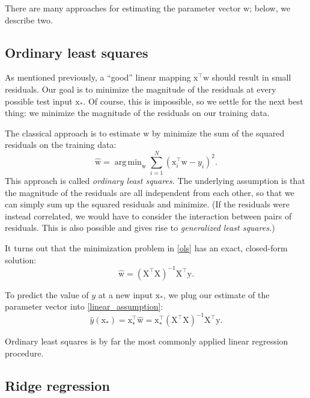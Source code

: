 \documentclass{article}
\newcommand{\inv}{^{-1}}
\newcommand{\trans}{^\top}
\newcommand{\mat}[1]{\bm{\mathrm{#1}}}
\renewcommand{\vec}[1]{\bm{\mathrm{#1}}}
\DeclareMathOperator*{\argmin}{arg\,min}
\begin{document}
There are many approaches for estimating the parameter vector
$\vec{w}$; below, we describe two.

\subsection*{Ordinary least squares}

As mentioned previously, a ``good'' linear mapping $\vec{x}\trans
\vec{w}$ should result in small residuals.  Our goal is to minimize
the magnitude of the residuals at every possible test input
$\vec{x}_\ast$.  Of course, this is impossible, so we settle for the
next best thing: we minimize the magnitude of the residuals on our
training data.

The classical approach is to estimate $\vec{w}$ by minimize the sum of
the squared residuals on the training data:
\begin{equation}
  \label{ols}
  \hat{\vec{w}}
  =
  \argmin_{\vec{w}}
  \sum_{i = 1}^N
  (\vec{x}_i\trans \vec{w} - y_i)^2.
\end{equation}
This approach is called \emph{ordinary least squares.}  The underlying
assumption is that the magnitude of the residuals are all independent
from each other, so that we can simply sum up the squared residuals
and minimize.  (If the residuals were instead correlated, we would
have to consider the interaction between pairs of residuals.  This is
also possible and gives rise to \emph{generalized least squares.})

It turns out that the minimization problem in \eqref{ols} has an
exact, closed-form solution:
\begin{equation*}
  \hat{\vec{w}} = (\mat{X}\trans\mat{X})\inv \mat{X}\trans \vec{y}.
\end{equation*}

To predict the value of $y$ at a new input $\vec{x}_\ast$, we plug our
estimate of the parameter vector into \eqref{linear_assumption}:
\begin{equation*}
  \hat{y}(\vec{x}_\ast)
  =
  \vec{x}_\ast\trans \hat{\vec{w}} =
  \vec{x}_\ast\trans (\mat{X}\trans\mat{X})\inv \mat{X}\trans \vec{y}
  .
\end{equation*}

Ordinary least squares is by far the most commonly applied linear
regression procedure.

\subsection*{Ridge regression}
\end{document}
